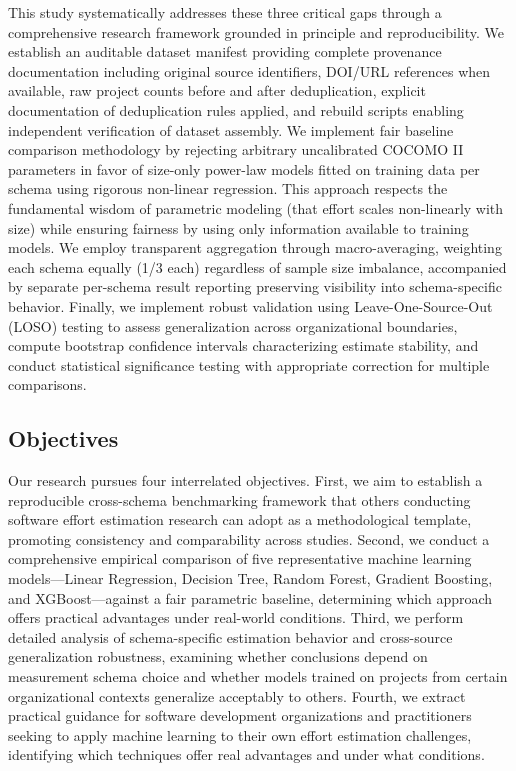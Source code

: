 \documentclass[11pt,a4paper]{article}
\begin{document}
This study systematically addresses these three critical gaps through a comprehensive research framework grounded in principle and reproducibility. We establish an auditable dataset manifest providing complete provenance documentation including original source identifiers, DOI/URL references when available, raw project counts before and after deduplication, explicit documentation of deduplication rules applied, and rebuild scripts enabling independent verification of dataset assembly. We implement fair baseline comparison methodology by rejecting arbitrary uncalibrated COCOMO II parameters in favor of size-only power-law models fitted on training data per schema using rigorous non-linear regression. This approach respects the fundamental wisdom of parametric modeling (that effort scales non-linearly with size) while ensuring fairness by using only information available to training models. We employ transparent aggregation through macro-averaging, weighting each schema equally (1/3 each) regardless of sample size imbalance, accompanied by separate per-schema result reporting preserving visibility into schema-specific behavior. Finally, we implement robust validation using Leave-One-Source-Out (LOSO) testing to assess generalization across organizational boundaries, compute bootstrap confidence intervals characterizing estimate stability, and conduct statistical significance testing with appropriate correction for multiple comparisons.

\subsection{Objectives}

Our research pursues four interrelated objectives. First, we aim to establish a reproducible cross-schema benchmarking framework that others conducting software effort estimation research can adopt as a methodological template, promoting consistency and comparability across studies. Second, we conduct a comprehensive empirical comparison of five representative machine learning models---Linear Regression, Decision Tree, Random Forest, Gradient Boosting, and XGBoost---against a fair parametric baseline, determining which approach offers practical advantages under real-world conditions. Third, we perform detailed analysis of schema-specific estimation behavior and cross-source generalization robustness, examining whether conclusions depend on measurement schema choice and whether models trained on projects from certain organizational contexts generalize acceptably to others. Fourth, we extract practical guidance for software development organizations and practitioners seeking to apply machine learning to their own effort estimation challenges, identifying which techniques offer real advantages and under what conditions.
\end{document}
